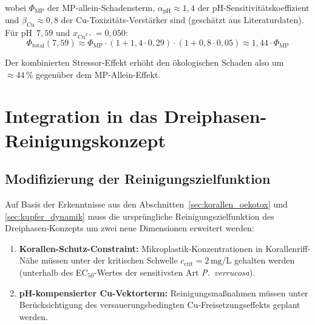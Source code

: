 ﻿\documentclass[12pt,a4paper]{article}
\theoremstyle{definition}
\theoremstyle{remark}
\begin{document}
wobei $\Phi_{\text{MP}}$ der MP-allein-Schadensterm, $\alpha_{\text{pH}} \approx 1{,}4$
der pH-Sensitivit\"atskoeffizient und $\beta_{\text{Cu}} \approx 0{,}8$ der
Cu-Toxizit\"ats-Verstärker sind (gesch\"atzt aus Literaturdaten).
F\"ur pH~$7{,}59$ und $x_{\text{Cu}^{2+}} = 0{,}050$:
\begin{equation}
  \Phi_{\text{total}}(7{,}59) \approx \Phi_{\text{MP}} \cdot
  (1 + 1{,}4 \cdot 0{,}29) \cdot (1 + 0{,}8 \cdot 0{,}05)
  \approx 1{,}44 \cdot \Phi_{\text{MP}}
\end{equation}

Der kombinierten Stressor-Effekt erh\"oht den \"okologischen Schaden also um
$\approx 44\,\%$ gegen\"uber dem MP-Allein-Effekt.

\section{Integration in das Dreiphasen-Reinigungskonzept}
\label{sec:integration_dreiphasen}

\subsection{Modifizierung der Reinigungszielfunktion}
\label{subsec:zielfunktion}

Auf Basis der Erkenntnisse aus den Abschnitten~\ref{sec:korallen_oekotox} und
\ref{sec:kupfer_dynamik} muss die urspr\"ungliche Reinigungszielfunktion des
Dreiphasen-Konzepts um zwei neue Dimensionen erweitert werden:

\begin{enumerate}[leftmargin=*]
  \item \textbf{Korallen-Schutz-Constraint:} Mikroplastik-Konzentrationen in
    Korallenriff-N\"ahe m\"ussen unter der kritischen Schwelle
    $c_{\text{crit}} = 2\,\text{mg/L}$ gehalten werden (unterhalb des
    EC$_{50}$-Wertes der sensitivsten Art \textit{P.~verrucosa}).
  \item \textbf{pH-kompensierter Cu-Vektorterm:} Reinigungsmaßnahmen m\"ussen
    unter Ber\"ucksichtigung des versauerungsbedingten Cu-Freisetzungseffekts
    geplant werden.
\end{enumerate}
\end{document}

